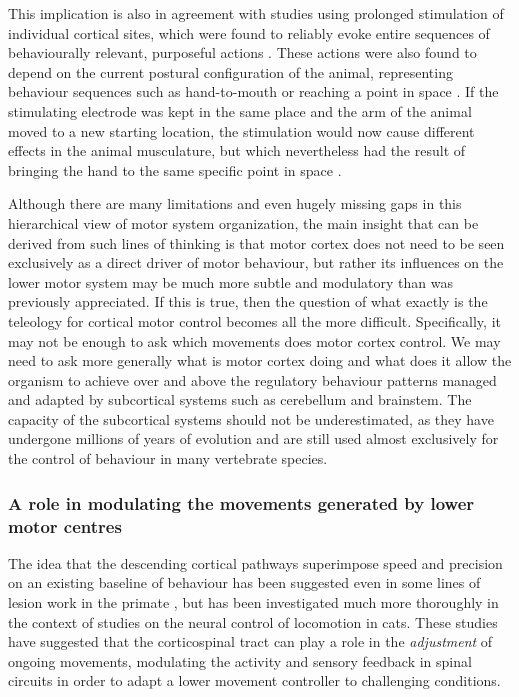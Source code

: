This implication is also in agreement with studies using prolonged stimulation of individual cortical sites, which were found to reliably evoke entire sequences of behaviourally relevant, purposeful actions \cite{Ferrier1873,Clark1937,Graziano2002}. These actions were also found to depend on the current postural configuration of the animal, representing behaviour sequences such as hand-to-mouth or reaching a point in space \cite{Graziano2002}. If the stimulating electrode was kept in the same place and the arm of the animal moved to a new starting location, the stimulation would now cause different effects in the animal musculature, but which nevertheless had the result of bringing the hand to the same specific point in space \cite{Graziano2002}.

Although there are many limitations and even hugely missing gaps in this hierarchical view of motor system organization, the main insight that can be derived from such lines of thinking is that motor cortex does not need to be seen exclusively as a direct driver of motor behaviour, but rather its influences on the lower motor system may be much more subtle and modulatory than was previously appreciated. If this is true, then the question of what exactly is the teleology for cortical motor control becomes all the more difficult. Specifically, it may not be enough to ask which movements does motor cortex control. We may need to ask more generally what is motor cortex doing and what does it allow the organism to achieve over and above the regulatory behaviour patterns managed and adapted by subcortical systems such as cerebellum and brainstem. The capacity of the subcortical systems should not be underestimated, as they have undergone millions of years of evolution and are still used almost exclusively for the control of behaviour in many vertebrate species.

\subsubsection*{A role in modulating the movements generated by lower motor centres}

The idea that the descending cortical pathways superimpose speed and precision on an existing baseline of behaviour has been suggested even in some lines of lesion work in the primate \cite{Lawrence1968a}, but has been investigated much more thoroughly in the context of studies on the neural control of locomotion in cats. These studies have suggested that the corticospinal tract can play a role in the \emph{adjustment} of ongoing movements, modulating the activity and sensory feedback in spinal circuits in order to adapt a lower movement controller to challenging conditions.

